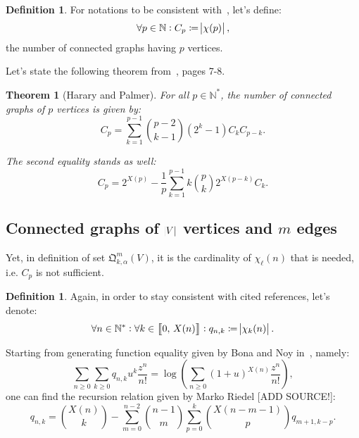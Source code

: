 \documentclass{article}
\newtheorem{theorem}[lemma]{Theorem}
\theoremstyle{definition}
\newtheorem{definition}[lemma]{Definition}
\theoremstyle{remark}
\newcommand{\intint}[2]{\left\llbracket#1, \, #2\right\rrbracket}
\begin{document}
		\begin{definition} For notations to be consistent with~\cite{Harary&Palmer1973}, let's define:
		\[\forall p \in \mathbb N : C_p \coloneqq \abs {\chi(p)},\]
		the number of connected graphs having $p$ vertices.
		\end{definition}

		Let's state the following theorem from~\cite{Harary&Palmer1973}, pages 7-8.

		\begin{theorem}[Harary and Palmer] For all $p \in \mathbb N^*$, the number of connected graphs of $p$ vertices is given by:
		\[C_p = \sum_{k=1}^{p-1}\binom {p-2}{k-1}\left(2^k-1\right)C_kC_{p-k}.\]

		The second equality stands as well:
		\[C_p = 2^{X(p)} - \frac 1p\sum_{k=1}^{p-1}k\binom pk2^{X(p-k)}C_k.\]
		\end{theorem}

	\subsection{Connected graphs of $\abs V$ vertices \textbf{and} $m$ edges}
		Yet, in definition of set $\mathfrak Q_{k,\alpha}^m(V)$, it is the cardinality of $\chi_\ell(n)$ that is needed, i.e. $C_p$ is not sufficient.

		\begin{definition} Again, in order to stay consistent with cited references, let's denote:
		\[\forall n \in \mathbb N^* : \forall k \in \intint 0{X(n)} : q_{n,k} \coloneqq \abs {\chi_k(n)}.\]
		\end{definition}

		Starting from generating function equality given by Bona and Noy in~\cite{Bona&Noy2015}, namely:
		\[\sum_{n \geq 0}\sum_{k \geq 0}q_{n,k}u^k\frac {z^n}{n!} = \log\left(\sum_{n \geq 0}(1+u)^{X(n)}\frac {z^n}{n!}\right),\]
		one can find the recursion relation given by Marko Riedel [ADD SOURCE!]:
		\[q_{n,k} = \binom {X(n)}k - \sum_{m=0}^{n-2}\binom {n-1}m\sum_{p=0}^k\binom {X(n-m-1)}pq_{m+1,k-p}.\]
\end{document}
